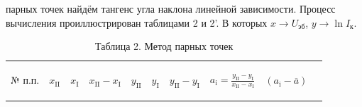  парных точек найдём тангенс угла наклона линейной зависимости. Процесс вычисления проиллюстрирован таблицами 2 и 2'. В которых $x \rightarrow{} U_{\text{эб}}$, $y\rightarrow{} \ln I_{\text{к}}$.
\begin{center}
\begin{table}[H]
\centering
\caption*{Таблица 2. Метод парных точек}
\label{tabl:2}
\begin{tabular}{|c|c|c|c|c|c|c|c|c|c|}
\hline
\begin{minipage}{7mm}
    № п.п. 
\end{minipage}&
\begin{minipage}{7mm}
   \begin{center} $x_{\text{II}}$ \end{center} 
\end{minipage} &
\begin{minipage}{7mm}
   \begin{center} $x_{\text{I}}$ \end{center} 
\end{minipage} &
\begin{minipage}{14mm}
   \begin{center} $x_{\text{II}}-x_{\text{I}}$ \end{center} 
\end{minipage}&
\begin{minipage}{7mm}
   \begin{center} $y_{\text{II}}$ \end{center} 
\end{minipage}&
\begin{minipage}{7mm}
   \begin{center} $y_{\text{I}}$ \end{center} 
\end{minipage}&
\begin{minipage}{14mm}
   \begin{center} $y_{\text{II}}-y_{\text{I}}$ \end{center} 
\end{minipage}&
\begin{minipage}{25mm}
   \begin{center} $a_{\text{i}}=\frac{y_{\text{II}}-y_{\text{I}}}{x_{\text{II}}-x_{\text{I}}}$ \end{center} 
\end{minipage}&
\begin{minipage}{21mm}
     \begin{center} $(a_{\text{i}}-\overline{a})$ \end{center}

\end{minipage}
\end{tabular}
\end{table}
\end{center}
